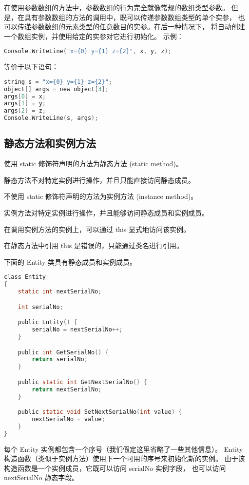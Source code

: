 在使用参数数组的方法中，参数数组的行为完全就像常规的数组类型参数。
但是，在具有参数数组的方法的调用中，既可以传递参数数组类型的单个实参，
也可以传递参数数组的元素类型的任意数目的实参。在后一种情况下，
将自动创建一个数组实例，并使用给定的实参对它进行初始化。
示例：

 \begin{lstlisting}[language=C]
Console.WriteLine("x={0} y={1} z={2}", x, y, z);
 \end{lstlisting}

等价于以下语句：

 \begin{lstlisting}[language=C]
string s = "x={0} y={1} z={2}";
object[] args = new object[3];
args[0] = x;
args[1] = y;
args[2] = z;
Console.WriteLine(s, args);
 \end{lstlisting}

\subsection{静态方法和实例方法}
使用 static 修饰符声明的方法为静态方法 (static method)。

静态方法不对特定实例进行操作，并且只能直接访问静态成员。

不使用 static 修饰符声明的方法为实例方法 (instance method)。

实例方法对特定实例进行操作，并且能够访问静态成员和实例成员。

在调用实例方法的实例上，可以通过 this 显式地访问该实例。

在静态方法中引用 this 是错误的，只能通过类名进行引用。

下面的 Entity 类具有静态成员和实例成员。

 \begin{lstlisting}[language=C]
class Entity
{
    static int nextSerialNo;

    int serialNo;

    public Entity() {
        serialNo = nextSerialNo++;
    }

    public int GetSerialNo() {
        return serialNo;
    }

    public static int GetNextSerialNo() {
        return nextSerialNo;
    }

    public static void SetNextSerialNo(int value) {
        nextSerialNo = value;
    }
}
 \end{lstlisting}

每个 Entity 实例都包含一个序号（我们假定这里省略了一些其他信息）。
Entity 构造函数（类似于实例方法）使用下一个可用的序号来初始化新的实例。
由于该构造函数是一个实例成员，它既可以访问 serialNo 实例字段，
也可以访问 nextSerialNo 静态字段。

